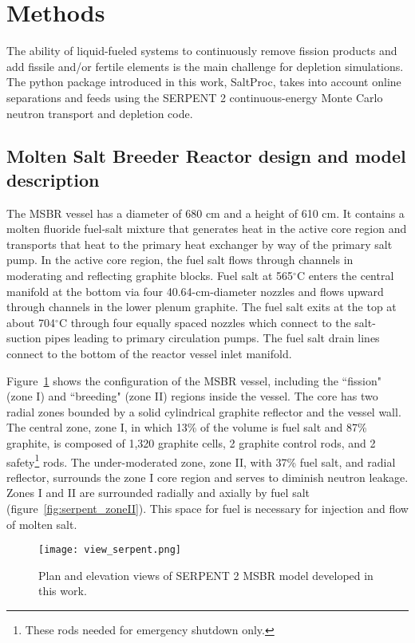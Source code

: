 \section{Methods}

The ability of liquid-fueled systems to continuously remove fission products and add 
fissile and/or fertile elements is the main challenge for depletion simulations. 
The python package introduced in this work, SaltProc, takes into account online 
separations and feeds using the SERPENT 2 continuous-energy Monte Carlo neutron 
transport and depletion code.

\subsection{Molten Salt Breeder Reactor design and model description}
The \gls{MSBR} vessel has a diameter of 680 cm and a height of 610 cm. It 
contains a molten fluoride fuel-salt mixture that generates heat in the active 
core region and transports that heat to the primary heat exchanger by way of 
the primary salt pump. In the active core region, the fuel salt flows through 
channels in moderating and reflecting graphite blocks. Fuel salt at
565$^{\circ}$C enters the central manifold at the bottom via four 
40.64-cm-diameter nozzles and flows upward through channels in the lower plenum 
graphite. The fuel salt exits at the top at about 704$^{\circ}$C through four 
equally spaced nozzles which connect to the salt-suction pipes leading to 
primary circulation pumps. The fuel salt drain lines connect to the bottom of 
the reactor vessel inlet manifold.

Figure~\ref{fig:serpent_plan_view} shows the configuration of the 
\gls{MSBR} vessel, including the ``fission" (zone I) and ``breeding" 
(zone II) regions inside the vessel. The core has two radial zones bounded by a 
solid cylindrical graphite reflector and the vessel wall. The central zone, 
zone I, in which 13\% of the volume is fuel salt and 87\% graphite, is
composed of 1,320 graphite cells, 2 graphite control rods, and 2 
safety\footnote{ These rods needed for emergency shutdown only.} rods. The 
under-moderated zone, zone II, with 37\% fuel salt, and radial reflector, 
surrounds the zone I core region and serves to diminish neutron leakage. Zones 
I and II are surrounded radially and axially by fuel salt 
(figure~\ref{fig:serpent_zoneII}). This space for fuel is necessary for 
injection and flow of molten salt.

\begin{figure}[hbp!] %
  \texttt{[image: view\_serpent.png]}
  \caption{Plan and elevation views of SERPENT 2 \gls{MSBR} model developed in 
  this work.}
  \label{fig:serpent_plan_view}
\end{figure}

